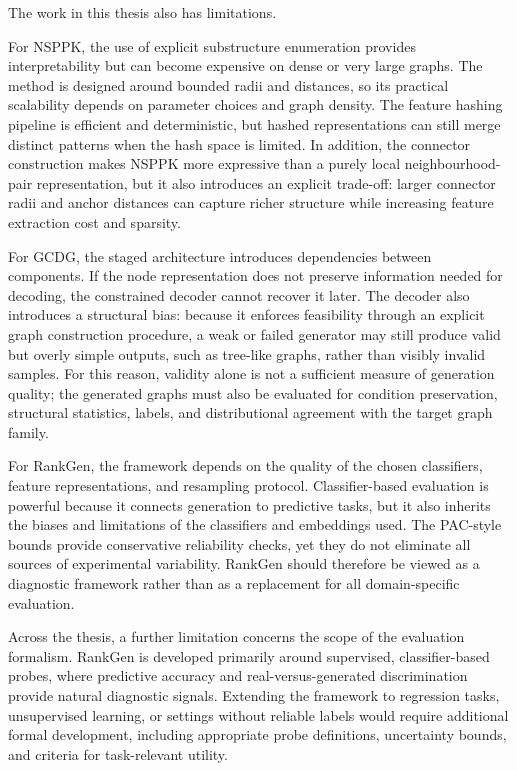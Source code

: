 The work in this thesis also has limitations.

For NSPPK, the use of explicit substructure enumeration provides
interpretability but can become expensive on dense or very large graphs. The
method is designed around bounded radii and distances, so its practical
scalability depends on parameter choices and graph density. The feature hashing
pipeline is efficient and deterministic, but hashed representations can still
merge distinct patterns when the hash space is limited. In addition, the
connector construction makes NSPPK more expressive than a purely local
neighbourhood-pair representation, but it also introduces an explicit trade-off:
larger connector radii and anchor distances can capture richer structure while
increasing feature extraction cost and sparsity.

For GCDG, the staged architecture introduces dependencies between components.
If the node representation does not preserve information needed for decoding,
the constrained decoder cannot recover it later. The decoder also introduces a
structural bias: because it enforces feasibility through an explicit graph
construction procedure, a weak or failed generator may still produce valid but
overly simple outputs, such as tree-like graphs, rather than visibly invalid
samples. For this reason, validity alone is not a sufficient measure of
generation quality; the generated graphs must also be evaluated for
condition preservation, structural statistics, labels, and distributional
agreement with the target graph family.

For RankGen, the framework depends on the quality of the chosen classifiers,
feature representations, and resampling protocol. Classifier-based evaluation
is powerful because it connects generation to predictive tasks, but it also
inherits the biases and limitations of the classifiers and embeddings used.
The PAC-style bounds provide conservative reliability checks, yet they do not
eliminate all sources of experimental variability. RankGen should therefore be
viewed as a diagnostic framework rather than as a replacement for all
domain-specific evaluation.

Across the thesis, a further limitation concerns the scope of the evaluation
formalism. RankGen is developed primarily around supervised, classifier-based
probes, where predictive accuracy and real-versus-generated discrimination
provide natural diagnostic signals. Extending the framework to regression
tasks, unsupervised learning, or settings without reliable labels would require
additional formal development, including appropriate probe definitions,
uncertainty bounds, and criteria for task-relevant utility.

